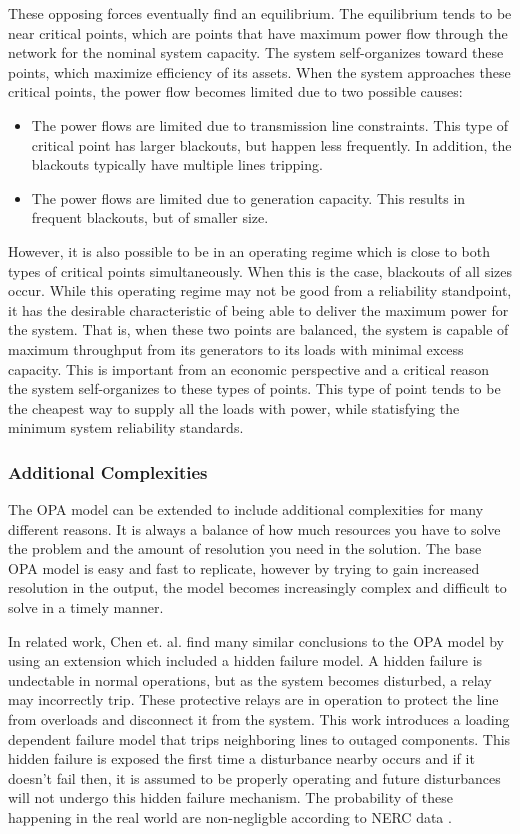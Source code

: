 These opposing forces eventually find an equilibrium.  The equilibrium tends to be near critical points, which are points that have maximum power flow through the network for the nominal system capacity.  The system self-organizes toward these points, which maximize efficiency of its assets.  When the system approaches these critical points, the power flow becomes limited due to two possible causes:
\begin{itemize}
\item The power flows are limited due to transmission line constraints.  This type of critical point has larger blackouts, but happen less frequently.  In addition, the blackouts typically have  multiple lines tripping.
\item The power flows are limited due to generation capacity.  This results in frequent blackouts, but of smaller size.
\end{itemize}
However, it is also possible to be in an operating regime which is close to both types of critical points simultaneously.  When this is the case, blackouts of all sizes occur.  While this operating regime may not be good from a reliability standpoint, it has the desirable characteristic of being able to deliver the maximum power for the system.   That is, when these two points are balanced, the system is capable of maximum throughput from its generators to its loads with minimal excess capacity.  This is important from an economic perspective and a critical reason the system self-organizes to these types of points.  This type of point tends to be the cheapest way to supply all the loads with power, while statisfying the minimum system reliability standards.

\subsubsection{Additional Complexities}

The OPA model can be extended to include additional complexities for many different reasons.  It is always a balance of how much resources you have to solve the problem and the amount of resolution you need in the solution.  The base OPA model is easy and fast to replicate, however by trying to gain increased resolution in the output, the model becomes increasingly complex and difficult to solve in a timely manner.

In related work, Chen et. al. \cite{chen_2005} find many similar conclusions to the OPA model by using an extension which included a hidden failure model.  A hidden failure is undectable in normal operations, but as the system becomes disturbed, a relay may incorrectly trip.  These protective relays are in operation to protect the line from overloads and disconnect it from the system.  This work introduces a loading dependent failure model that trips neighboring lines to outaged components.  This hidden failure is exposed the first time a disturbance nearby occurs and if it doesn't fail then, it is assumed to be properly operating and future disturbances will not undergo this hidden failure mechanism.  The probability of these happening in the real world are non-negligble according to NERC data \cite{nerc_dawg}.  

